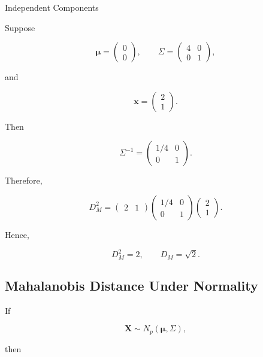 \begin{workedexamplebox}{Independent Components}

Suppose

\[
\boldsymbol{\mu}
=
\begin{pmatrix}
0\\
0
\end{pmatrix},
\qquad
\Sigma
=
\begin{pmatrix}
4&0\\
0&1
\end{pmatrix},
\]

and

\[
\mathbf{x}
=
\begin{pmatrix}
2\\
1
\end{pmatrix}.
\]

Then

\[
\Sigma^{-1}
=
\begin{pmatrix}
1/4&0\\
0&1
\end{pmatrix}.
\]

Therefore,

\[
D_M^2
=
\begin{pmatrix}
2&1
\end{pmatrix}
\begin{pmatrix}
1/4&0\\
0&1
\end{pmatrix}
\begin{pmatrix}
2\\
1
\end{pmatrix}.
\]

Hence,

\begin{answerbox}
\[
\boxed{
D_M^2
=
2,
\qquad
D_M=\sqrt2.
}
\]
\end{answerbox}

\end{workedexamplebox}

\subsection{Mahalanobis Distance Under Normality}
\label{subsec:mahalanobis-normality}

If

\[
\mathbf{X}
\sim
N_p
(
\boldsymbol{\mu},
\Sigma
),
\]

then

